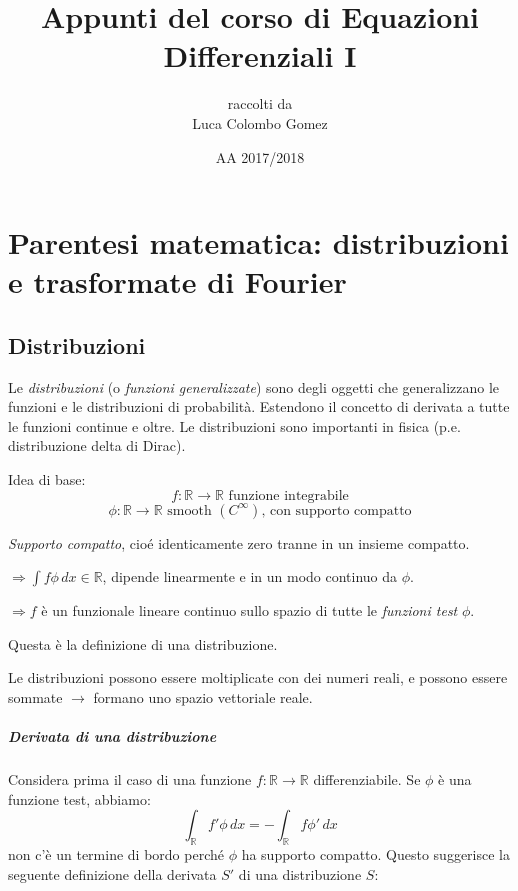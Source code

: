 \documentclass[a4paper,11pt]{report}
\title{Appunti del corso di Equazioni Differenziali I}
\author{raccolti da \\Luca Colombo Gomez}
\date{AA 2017/2018}
\newcommand{\R}{\mathbb{R}}
\begin{document}
\titlepage
\maketitle

\tableofcontents
\chapter{Parentesi matematica: distribuzioni e trasformate di Fourier}
\section{Distribuzioni}

Le \emph{distribuzioni} (o \emph{funzioni generalizzate}) sono degli oggetti che generalizzano le funzioni e le distribuzioni di probabilit\`a.
Estendono il concetto di derivata a tutte le funzioni continue e oltre.
Le distribuzioni sono importanti in fisica (p.e. distribuzione delta di Dirac).

\medskip
Idea di base:
\[
f:\R\rightarrow\R \text{ funzione integrabile}
\]
\[
\phi : \R \rightarrow \R \text{ smooth $\left(C^{\infty}\right)$, con supporto compatto} 
\]

\emph{Supporto compatto}, cio\'e identicamente zero tranne in un insieme compatto.

\smallskip

$\Rightarrow \int f \phi \, dx \in \mathbb{R}$, dipende linearmente e in un modo continuo da $\phi$.

\smallskip

$\Rightarrow f$ \`e un funzionale lineare continuo sullo spazio di tutte le \emph{funzioni test} $\phi.$

\smallskip

Questa \`e la definizione di una distribuzione.

Le distribuzioni possono essere moltiplicate con dei numeri reali, e possono essere sommate $\rightarrow$ formano uno spazio vettoriale reale.

\paragraph{Derivata di una distribuzione}

Considera prima il caso di una funzione $f:\R \rightarrow \R$ differenziabile. Se $\phi$ \`e una funzione test, abbiamo:
\[
\int_{\R}f'\phi \,dx = -\int_{\R}f\phi ' \,dx
\]
non c'\`e un termine di bordo perch\'e $\phi $ ha supporto compatto. 
Questo suggerisce la seguente definizione della derivata $S'$ di una distribuzione $S$:
\end{document}
